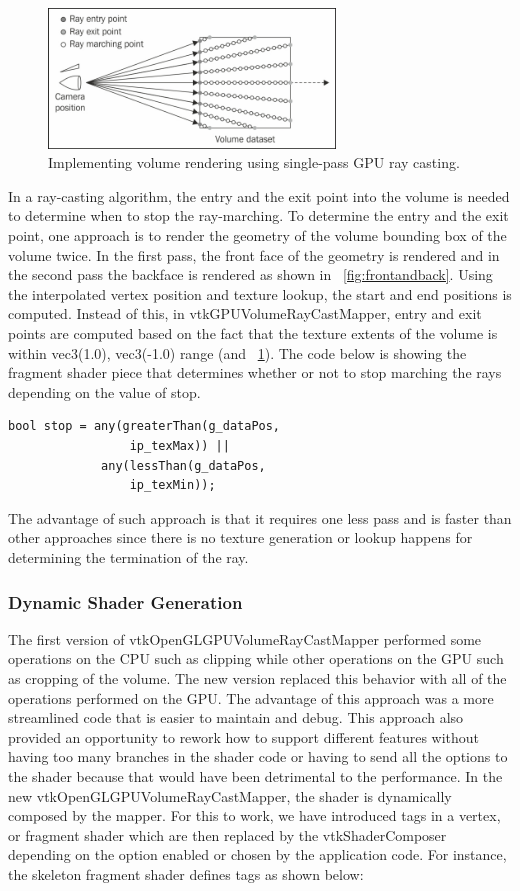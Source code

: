 \begin{figure}
\centering
\includegraphics[width=3in]{raycasting.jpg}
\caption{Implementing volume rendering using single-pass GPU ray casting.}
\label{fig:raycasting}
\end{figure}

In a ray-casting algorithm, the entry and the exit point into the volume is needed to determine when to stop the ray-marching. To determine the entry and the exit point, one approach is to render the geometry of the volume bounding box of the volume twice. In the first pass, the front face of the geometry is rendered and in the second pass the backface is rendered as shown in ~\ref{fig:frontandback}. Using the interpolated vertex position and texture lookup, the start and end positions is computed. Instead of this, in vtkGPUVolumeRayCastMapper, entry and exit points are computed based on the fact that the texture extents of the volume is within vec3(1.0), vec3(-1.0) range (and ~\ref{fig:raycasting}). The code below is showing the fragment shader piece that determines whether or not to stop marching the rays depending on the value of stop.
 
 \begin{lstlisting}[breaklines=true]
 bool stop = any(greaterThan(g_dataPos, 
                 ip_texMax)) ||
             any(lessThan(g_dataPos, 
                 ip_texMin));
 \end{lstlisting}
 
 The advantage of such approach is that it requires one less pass and is faster than other approaches since there is no texture generation or lookup happens for determining the termination of the ray.
 
 
 \subsubsection{Dynamic Shader Generation}
 The first version of vtkOpenGLGPUVolumeRayCastMapper performed some operations on the CPU such as clipping while other operations on the GPU such as cropping of the volume. The new version replaced this behavior with all of the operations performed on the GPU. The advantage of this approach was a more streamlined code that is easier to maintain and debug. This approach also provided an opportunity to rework how to support different features without having too many branches in the shader code or having to send all the options to the shader because that would have been detrimental to the performance. In the new vtkOpenGLGPUVolumeRayCastMapper, the shader is dynamically composed by the mapper. For this to work, we have introduced tags in a vertex, or fragment shader which are then replaced by the vtkShaderComposer depending on the option enabled or chosen by the application code. For instance, the skeleton fragment shader defines tags as shown below:
 
